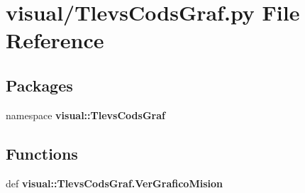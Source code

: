 \section{visual/\-Tlevs\-Cods\-Graf.py \-File \-Reference}
\label{_tlevs_cods_graf_8py}
\subsection*{\-Packages}
\begin{DoxyCompactItemize}
\item 
namespace {\bf visual\-::\-Tlevs\-Cods\-Graf}
\end{DoxyCompactItemize}
\subsection*{\-Functions}
\begin{DoxyCompactItemize}
\item 
def {\bf visual\-::\-Tlevs\-Cods\-Graf.\-Ver\-Grafico\-Mision}
\end{DoxyCompactItemize}
